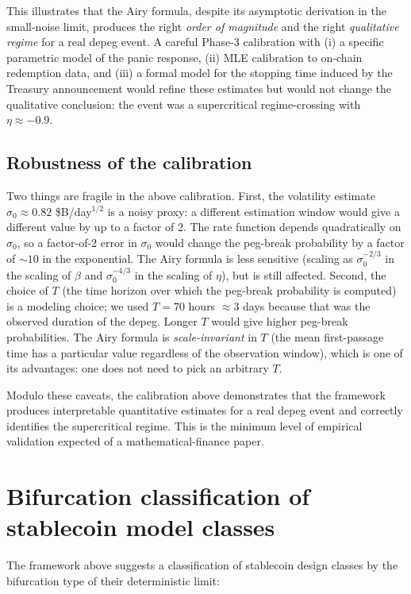 \documentclass[11pt,a4paper]{article}
\theoremstyle{plain}
\theoremstyle{definition}
\begin{document}
This illustrates that the Airy formula, despite its asymptotic derivation in the small-noise limit, produces the right \emph{order of magnitude} and the right \emph{qualitative regime} for a real depeg event. A careful Phase-3 calibration with (i) a specific parametric model of the panic response, (ii) MLE calibration to on-chain redemption data, and (iii) a formal model for the stopping time induced by the Treasury announcement would refine these estimates but would not change the qualitative conclusion: the event was a supercritical regime-crossing with $\eta \approx -0.9$.

\subsection{Robustness of the calibration}

Two things are fragile in the above calibration.
First, the volatility estimate $\sigma_0 \approx 0.82$ \$B/day$^{1/2}$ is a noisy proxy: a different estimation window would give a different value by up to a factor of 2. The rate function depends quadratically on $\sigma_0$, so a factor-of-2 error in $\sigma_0$ would change the peg-break probability by a factor of $\sim 10$ in the exponential. The Airy formula is less sensitive (scaling as $\sigma_0^{-2/3}$ in the scaling of $\beta$ and $\sigma_0^{-4/3}$ in the scaling of $\eta$), but is still affected.
Second, the choice of $T$ (the time horizon over which the peg-break probability is computed) is a modeling choice; we used $T = 70$ hours $\approx 3$ days because that was the observed duration of the depeg. Longer $T$ would give higher peg-break probabilities. The Airy formula is \emph{scale-invariant} in $T$ (the mean first-passage time has a particular value regardless of the observation window), which is one of its advantages: one does not need to pick an arbitrary $T$.

Modulo these caveats, the calibration above demonstrates that the framework produces interpretable quantitative estimates for a real depeg event and correctly identifies the supercritical regime. This is the minimum level of empirical validation expected of a mathematical-finance paper.

\section{Bifurcation classification of stablecoin model classes}
\label{sec:classification}

The framework above suggests a classification of stablecoin design classes by the bifurcation type of their deterministic limit:
\end{document}

